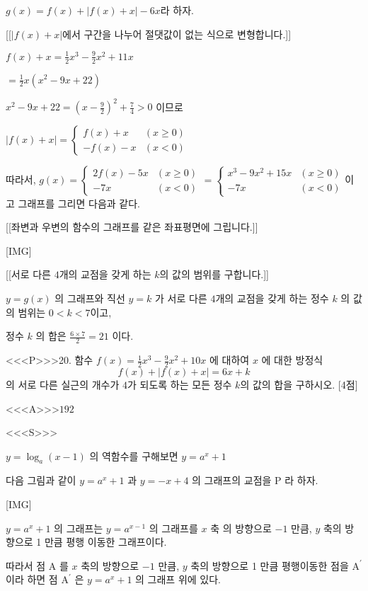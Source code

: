 \documentclass{oblivoir}
\begin{document}
$g(x)=f(x)+ \left| f(x)+x \right| -6x $라 하자.

[[$\left| f(x)+x \right|$에서 구간을 나누어 절댓값이 없는 식으로 변형합니다.]]

$f(x)+x=\frac{1}{2} x^{3}-\frac{9}{2} x^{2}+11 x$

$=\frac{1}{2} x\left(x^{2}-9 x+22\right)$

$x^{2}-9 x+22=\left(x-\frac{9}{2}\right)^{2}+\frac{7}{4}>0 $ 이므로

$|f(x)+x|= \begin{cases}f(x)+x & (x \geq 0) \\
-f(x)-x & (x<0)\end{cases}$

따라서, 
$g(x)=\begin{cases} 2f(x)-5x & (x \geq 0) \\
    -7x & (x<0)\end{cases} = \begin{cases}
x^{3}-9 x^{2}+15 x & (x \geq 0) \\
-7 x & (x<0)
\end{cases}$이고 그래프를 그리면 다음과 같다.

[[좌변과 우변의 함수의 그래프를 같은 좌표평면에 그립니다.]]

[IMG]

[[서로 다른 $4$개의 교점을 갖게 하는 $k$의 값의 범위를 구합니다.]]

$y=g(x)$ 의 그래프와 직선 $y=k$ 가 서로 다른 $4$개의 교점을 갖게 하는 정수 $k$ 의 값의 범위는 $0<k<7$이고,

정수 $k$ 의 합은 $\frac{6 \times 7}{2}=21$ 이다.


<<<P>>>20. 함수 $f(x)=\frac{1}{2} x^{3}-\frac{9}{2} x^{2}+10 x$ 에 대하여 $x$ 에 대한 방정식
$$
f(x)+|f(x)+x|=6 x+k
$$
의 서로 다른 실근의 개수가 $4$가 되도록 하는 모든 정수 $k$의 값의 합을 구하시오. [4점]

<<<A>>>$192$

<<<S>>>



$y=\log _{a}(x-1)$ 의 역함수를 구해보면 $y=a^{x}+1$

다음 그림과 같이 $y=a^{x}+1$ 과 $y=-x+4$ 의 그래프의 교점을 $\mathrm{P}$ 라 하자.

[IMG]

$y=a^{x}+1$ 의 그래프는 $y=a^{x-1}$ 의 그래프를 $x$ 축 의 방향으로 $-1$ 만큼, $y$ 축의 방향으로 1 만큼 평행 이동한 그래프이다.

따라서 점 $\mathrm{A}$ 를 $x$ 축의 방향으로 $-1$ 만큼, $y$ 축의 방향으로 1 만큼 평행이동한 점을 $\mathrm{A}^{\prime}$ 이라 하면 점 $\mathrm{A}^{\prime}$ 은 $y=a^{x}+1$ 의 그래프 위에 있다.
\end{document}
